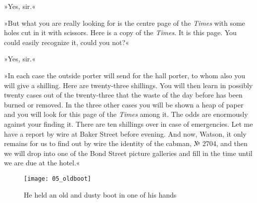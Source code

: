 »Yes, sir.«

»But what you are really looking for is the centre page of the \textit{Times} with some holes cut in it with scissors. Here is a copy of the \textit{Times}. It is this page. You could easily recognize it, could you not?«

»Yes, sir.«

»In each case the outside porter will send for the hall porter, to whom also you will give a shilling. Here are twenty-three shillings. You will then learn in possibly twenty cases out of the twenty-three that the waste of the day before has been burned or removed. In the three other cases you will be shown a heap of paper and you will look for this page of the \textit{Times} among it. The odds are enormously against your finding it. There are ten shillings over in case of emergencies. Let me have a report by wire at Baker Street before evening. And now, Watson, it only remains for us to find out by wire the identity of the cabman, № 2704, and then we will drop into one of the Bond Street picture galleries and fill in the time until we are due at the hotel.«


\clearpage
\vfill
\begin{figure}[ph!]
\centering
\texttt{[image: 05\_oldboot]}
\caption{He held an old and dusty boot in one of his hands}
\end{figure}
\vfill
\thispagestyle{empty}
\clearpage
